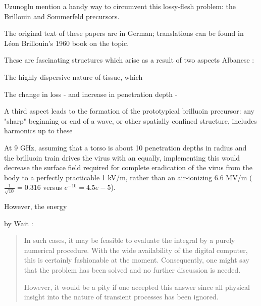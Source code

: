 \documentclass[paper.tex]{subfiles}
\begin{document}
Uzunoglu \cite{Theoretical2020} mention a handy way to circumvent this lossy-flesh problem: the Brillouin and Sommerfeld precursors.



The original text of these papers are in German; translations can be found in Léon Brillouin's 1960 book\cite{Wave1960} on the topic. \footnotemark





These are fascinating structures which arise as a result of two aspects Albanese \cite{Shortrisetime1989}: 

The highly dispersive nature of tissue, which

The change in loss - and increase in penetration depth - 

A third aspect leads to the formation of the prototypical brilluoin precursor: any "sharp" beginning or end of a wave, or other spatially confined structure, includes harmonics up to these \footnotemark




At 9 GHz, assuming that a torso is about 10 penetration depths in radius and the brilluoin train drives the virus with an equally, implementing this would decrease the surface field required for complete eradication of the virus from the body to a perfectly practicable 1 kV/m, rather than an air-ionizing 6.6 MV/m ($\frac{1}{\sqrt{10}}=0.316$ versus $e^{-10}=4.5e-5$). 

However, the energy





by Wait \cite{Propagation1965}:

\begin{quote}
In such cases, it may be feasible to evaluate the integral by a purely numerical procedure. With the wide availability of the digital computer, this is certainly fashionable at the moment. Consequently, one might say that the problem has been solved and no further discussion is needed. 

However, it would be a pity if one accepted this answer since all physical insight into the nature of transient processes has been ignored. 
\end{quote}
\end{document}
